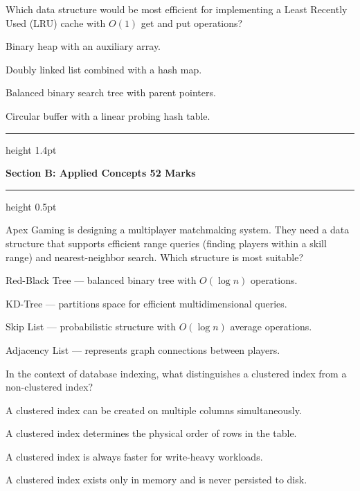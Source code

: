 \documentclass[11pt,a4paper]{article}
\begin{document}
\begin{questionblock}
 Which data structure would be most efficient for implementing a Least Recently Used (LRU) cache with $O(1)$ get and put operations?
\begin{mcoptions}
  \item[\textbf{A.}] Binary heap with an auxiliary array.
  \item[\textbf{B.}] Doubly linked list combined with a hash map.
  \item[\textbf{C.}] Balanced binary search tree with parent pointers.
  \item[\textbf{D.}] Circular buffer with a linear probing hash table.
\end{mcoptions}
\end{questionblock}

\newpage

{\color{NavyBlue}\hrule height 1.4pt}
\vspace{6pt}
{\Large\bfseries\color{NavyBlue} Section B: Applied Concepts \hfill {\normalfont\small 52 Marks}}
\vspace{6pt}
{\color{NavyBlue}\hrule height 0.5pt}
\vspace{12pt}

\begin{questionblock}
 Apex Gaming is designing a multiplayer matchmaking system. They need a data structure that supports efficient range queries (finding players within a skill range) and nearest-neighbor search. Which structure is most suitable?
\begin{mcoptions}
  \item[\textbf{A.}] Red-Black Tree --- balanced binary tree with $O(\log n)$ operations.
  \item[\textbf{B.}] KD-Tree --- partitions space for efficient multidimensional queries.
  \item[\textbf{C.}] Skip List --- probabilistic structure with $O(\log n)$ average operations.
  \item[\textbf{D.}] Adjacency List --- represents graph connections between players.
\end{mcoptions}
\end{questionblock}

\begin{questionblock}
 In the context of database indexing, what distinguishes a clustered index from a non-clustered index?
\begin{mcoptions}
  \item[\textbf{A.}] A clustered index can be created on multiple columns simultaneously.
  \item[\textbf{B.}] A clustered index determines the physical order of rows in the table.
  \item[\textbf{C.}] A clustered index is always faster for write-heavy workloads.
  \item[\textbf{D.}] A clustered index exists only in memory and is never persisted to disk.
\end{mcoptions}
\end{questionblock}
\end{document}
